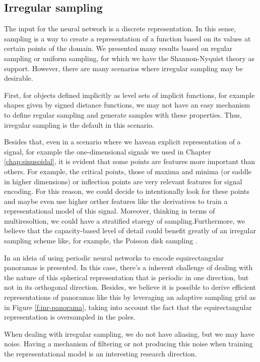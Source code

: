 \subsection{Irregular sampling}

The input for the neural network is a discrete representation. In this sense, sampling is a way to create a representation of a function based on its values at certain points of the domain. We presented many results based on regular sampling or uniform sampling, for which we have the Shannon-Nyquist theory as support. However, there are many scenarios where irregular sampling may be desirable.

First, for objects defined implicitly as level sets of implicit functions, for example shapes given by signed distance functions, we may not have an easy mechanism to define regular sampling and generate samples with these properties. Thus, irregular sampling is the default in this scenario.

Besides that, even in a scenario where we havean explicit representation of a signal, for example the one-dimensional signals we used in Chapter \ref{chap:sinusoidal}, it is evident that some points are features more important than others. For example, the critical points, those of maxima and minima (or saddle in higher dimensions) or inflection points are very relevant features for signal encoding. For this reason, we could decide to intentionally look for these points and maybe even use higher orther features like the derivatives to train a representational model of this signal. Moreover, thinking in terms of multiresoltion, we could have a stratified staregy of sampling.Furthermore, we believe that the capacity-based level of detail could benefit greatly of an irregular sampling scheme like, for example, the Poisson disk sampling \citep{stochastic_cook}.


In \citet{spectralPoster24} an ideia of using periodic neural networks to encode equirectangular panoramas is presented. In this case, there's a inherent challenge of dealing with the nature of this spherical representation that is periodic in one direction, but not in its orthogonal direction.  Besides, we believe it is possible to derive efficient representations of panoramas like this by leveraging an adaptive sampling grid as in Figure \ref{f:inr-panorama}, taking into account the fact that the equirectangular representation is oversampled in the poles.

When dealing with irregular sampling, we do not have aliasing, but we may have noise. Having a mechanism of filtering or not producing this noise when training the representational model is an interesting research direction.

